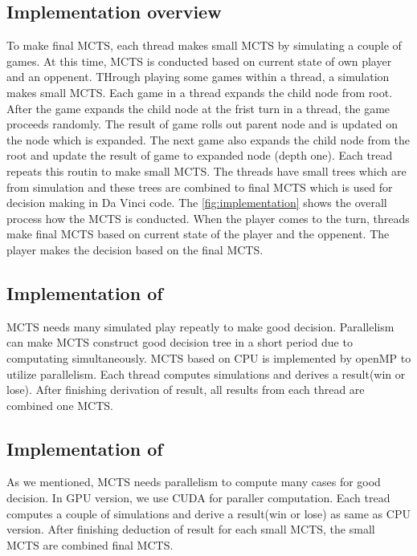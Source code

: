 \subsection{Implementation overview}
To make final MCTS, each thread makes small MCTS by simulating a couple of games.
At this time, MCTS is conducted based on current state of own player and an oppenent.
THrough playing some games within a thread, a simulation makes small MCTS.
Each game in a thread expands the child node from root. 
After the game expands the child node at the frist turn in a thread, the game proceeds randomly. 
The result of game rolls out parent node and is updated on the node which is expanded. 
The next game also expands the child node from the root and update the result of game to expanded node (depth one).
Each tread repeats this routin to make small MCTS. 
The threads have small trees which are from simulation and these trees are combined to final MCTS which is used for decision making in Da Vinci code. 
The \cref{fig:implementation} shows the overall process how the MCTS is conducted.
When the player comes to the turn, threads make final MCTS based on current state of the player and the oppenent. 
The player makes the decision based on the final MCTS. 

\subsection{Implementation of \cpu}
MCTS needs many simulated play repeatly to make good decision. 
Parallelism can make MCTS construct good decision tree in a short period due to computating simultaneously. 
MCTS based on CPU is implemented by openMP to utilize parallelism. 
Each thread computes simulations and derives a result(win or lose). 
After finishing derivation of result, all results from each thread are combined one MCTS.

\subsection{Implementation of \gpu}
As we mentioned, MCTS needs parallelism to compute many cases for good decision. 
In GPU version, we use CUDA for paraller computation. 
Each tread computes a couple of simulations and derive a result(win or lose) as same as CPU version. 
After finishing deduction of result for each small MCTS, the small MCTS are combined final MCTS. 